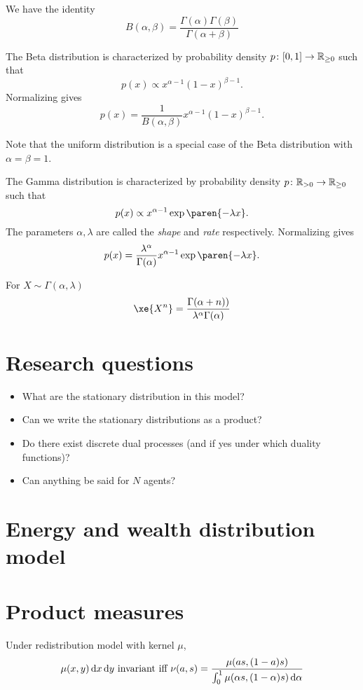 \documentclass{article}
\begin{document}
We have the identity
\[
B(\alpha, \beta)
= \frac{\Gamma(\alpha) \Gamma(\beta)}{\Gamma(\alpha + \beta)}
\]

The Beta distribution is characterized by probability density $p \colon [0, 1] \to \mathbb{R}_{\ge 0}$ such that
\[
p(x) \propto x^{\alpha - 1} (1-x)^{\beta - 1}.
\]
Normalizing gives
\[
p(x) = \frac{1}{B(\alpha, \beta)} x^{\alpha - 1} (1-x)^{\beta - 1}.
\]

Note that the uniform distribution is a special case of the Beta distribution with $\alpha = \beta = 1$.


The Gamma distribution is characterized by probability density $p \colon \mathbb{R}_{>0} \to \mathbb{R}_{\ge 0}$ such that
\[
p(x) \propto x^{\alpha - 1} \exp\paren{-\lambda x}.
\]
The parameters $\alpha, \lambda$ are called the \emph{shape} and \emph{rate} respectively. Normalizing gives
\[
p(x) = \frac{\lambda^{\alpha}}{\Gamma(\alpha)} x^{\alpha - 1} \exp\paren{-\lambda x}.
\]

For $X \sim \Gamma(\alpha, \lambda)$
\[
\xe{X^n}
= \frac{\Gamma(\alpha + n))}{\lambda^{\alpha} \Gamma(\alpha)}
\]


\section{Research questions}
\begin{itemize}
\item What are the stationary distribution in this model?
\item Can we write the stationary distributions as a product?
\item Do there exist discrete dual processes (and if yes under which duality functions)?
\item Can anything be said for $N$ agents?
\end{itemize}

\section{Energy and wealth distribution model}


\section{Product measures}

Under redistribution model with kernel $\mu$,
\[
\mu(x, y) \mathop{}\!\mathrm{d} x \mathop{}\!\mathrm{d} y  \text{ invariant iff }
\nu(a, s) = \frac{ \mu(as, (1-a)s) }{\int_0^1 \mu(\alpha s, (1-\alpha)s) \mathop{}\!\mathrm{d} \alpha}
\]
\end{document}
